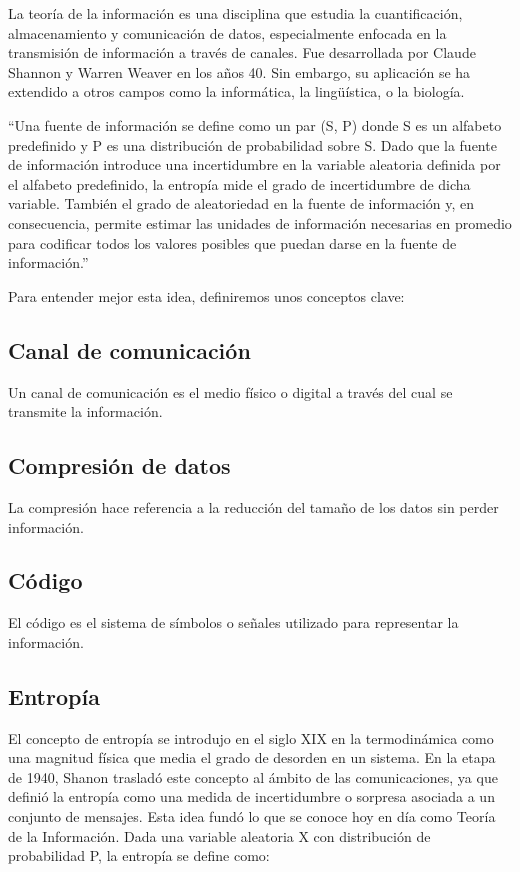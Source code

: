 \documentclass[11pt,spanish,listoffigures,listoftables]{tfgetsinf}
\begin{document}
La teoría de la información es una disciplina que estudia la cuantificación, almacenamiento y comunicación de datos, especialmente enfocada en la transmisión de información a través de canales. Fue desarrollada por Claude Shannon y Warren Weaver en los años 40. Sin embargo, su aplicación se ha extendido a otros campos como la informática, la lingüística, o la biología\cite{COV}.

“Una fuente de información se define como un par (S, P) donde S es un alfabeto predefinido y P es una distribución de probabilidad sobre S. Dado que la fuente de información introduce una incertidumbre en la variable aleatoria definida por el alfabeto predefinido, la entropía mide el grado de incertidumbre de dicha variable. También el grado de aleatoriedad en la fuente de información y, en consecuencia, permite estimar las unidades de información necesarias en promedio para codificar todos los valores posibles que puedan darse en la fuente de información.”\cite[p.~3]{ROB}

Para entender mejor esta idea, definiremos unos conceptos clave:  

\subsection{Canal de comunicación }

Un canal de comunicación es el medio físico o digital a través del cual se transmite la información.  

\subsection{Compresión de datos}

La compresión hace referencia a la reducción del tamaño de los datos sin perder información.  

\subsection{Código}

El código es el sistema de símbolos o señales utilizado para representar la información. 

\subsection{Entropía} 

El concepto de entropía se introdujo en el siglo XIX en la termodinámica como una magnitud física que media el grado de desorden en un sistema. En la etapa de 1940, Shanon trasladó este concepto al ámbito de las comunicaciones, ya que definió la entropía como una medida de incertidumbre o sorpresa asociada a un conjunto de mensajes\cite[p.~4]{ROB}. Esta idea fundó lo que se conoce hoy en día como Teoría de la Información. Dada una variable aleatoria X con distribución de probabilidad P, la entropía se define como: 
\end{document}

